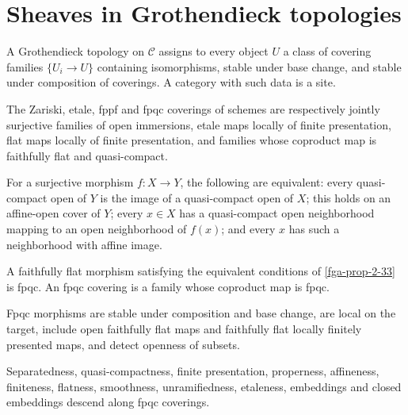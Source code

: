 \section{Sheaves in Grothendieck topologies}

\begin{definition}\label{fga-def-2-24}\uses{}
A Grothendieck topology on $\mathcal C$ assigns to every object $U$ a class of
covering families $\{U_i\to U\}$ containing isomorphisms, stable under base
change, and stable under composition of coverings.  A category with such data is
a site.
\end{definition}The Zariski, etale, fppf and fpqc coverings of schemes are respectively jointly
surjective families of open immersions, etale maps locally of finite
presentation, flat maps locally of finite presentation, and families whose
coproduct map is faithfully flat and quasi-compact.

\begin{proposition}\label{fga-prop-2-33}
For a surjective morphism $f:X\to Y$, the following are equivalent: every
quasi-compact open of $Y$ is the image of a quasi-compact open of $X$; this
holds on an affine-open cover of $Y$; every $x\in X$ has a quasi-compact open
neighborhood mapping to an open neighborhood of $f(x)$; and every $x$ has such
a neighborhood with affine image.
\end{proposition}
\begin{definition}\label{fga-def-2-34}
A faithfully flat morphism satisfying the equivalent conditions of
\cref{fga-prop-2-33} is fpqc.  An fpqc covering is a family whose coproduct map
is fpqc.
\end{definition}
\begin{proposition}\label{fga-prop-2-35}
Fpqc morphisms are stable under composition and base change, are local on the
target, include open faithfully flat maps and faithfully flat locally finitely
presented maps, and detect openness of subsets.
\end{proposition}
\begin{proposition}\label{fga-prop-2-36}
Separatedness, quasi-compactness, finite presentation, properness, affineness,
finiteness, flatness, smoothness, unramifiedness, etaleness, embeddings and
closed embeddings descend along fpqc coverings.
\end{proposition}

